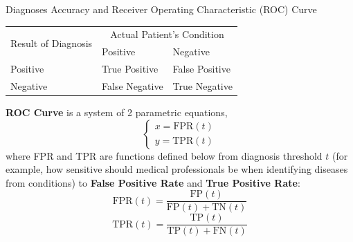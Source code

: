 \documentclass[8pt, hyperref={colorlinks=true}]{beamer}
\begin{document}

\begin{frame}{Diagnoses Accuracy and Receiver Operating Characteristic (ROC) Curve}
\begin{definition}
\centering
\begin{tabular}{l|l|l}
        \multirow{ 2}{*}{Result of Diagnosis} & \multicolumn{2}{c}{Actual Patient's Condition} \\
        \cline{2-3}
        & Positive & Negative \\
        \hline
        Positive & True Positive & False Positive \\
        \hline
        Negative & False Negative & True Negative \\
\end{tabular}
\end{definition}

\begin{definition}
\textbf{ROC Curve} is a system of 2 parametric equations,
\[
\begin{cases}
x=\text{FPR}(t)\\
y=\text{TPR}(t)
\end{cases}
\]
where FPR and TPR are functions defined below from diagnosis threshold $t$ (for example, how sensitive should medical professionals be when identifying diseases from conditions) to \textbf{False Positive Rate} and \textbf{True Positive Rate}:
\[
\text{FPR}(t)=\frac{\text{FP}(t)}{\text{FP}(t)+\text{TN}(t)}
\]
\[
\text{TPR}(t)=\frac{\text{TP}(t)}{\text{TP}(t)+\text{FN}(t)}
\]
\end{definition}
\end{frame}
\end{document}
